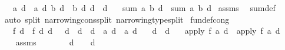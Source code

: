 \begin{isabellebody}
\ \ \ {\isachardoublequoteopen}a\ d\ {\isacharequal}{\kern0pt}\ a{\isacharprime}{\kern0pt}\ d{\isachardoublequoteclose}\ {\isachardoublequoteopen}b\ d\ {\isacharequal}{\kern0pt}\ b{\isacharprime}{\kern0pt}\ d{\isachardoublequoteclose}\ {\isachardoublequoteopen}d\ {\isacharequal}{\kern0pt}\ d{\isacharprime}{\kern0pt}{\isachardoublequoteclose}\isanewline
\ \ \ {\isachardoublequoteopen}sum\ a\ b\ d\ {\isacharequal}{\kern0pt}\ sum\ a{\isacharprime}{\kern0pt}\ b{\isacharprime}{\kern0pt}\ d{\isacharprime}{\kern0pt}{\isachardoublequoteclose}\isanewline
%
\isadelimproof
%
\endisadelimproof
%
\isatagproof
{}\isamarkupfalse%
\ assms\ \isamarkupfalse%
\ sum{\isacharunderscore}{\kern0pt}def\ \isamarkupfalse%
\ {\isacharparenleft}{\kern0pt}auto\ split{\isacharcolon}{\kern0pt}\ narrowing{\isacharunderscore}{\kern0pt}cons{\isachardot}{\kern0pt}split\ narrowing{\isacharunderscore}{\kern0pt}type{\isachardot}{\kern0pt}split{\isacharparenright}{\kern0pt}%
\endisatagproof
{\isafoldproof}%
%
\isadelimproof
\isanewline
%
\endisadelimproof
\isanewline
{}\isamarkupfalse%
\ {\isacharbrackleft}{\kern0pt}fundef{\isacharunderscore}{\kern0pt}cong{\isacharbrackright}{\kern0pt}{\isacharcolon}{\kern0pt}\isanewline
\ \ \ {\isachardoublequoteopen}f\ d\ {\isacharequal}{\kern0pt}\ f{\isacharprime}{\kern0pt}\ d{\isachardoublequoteclose}\ {\isachardoublequoteopen}{\isacharparenleft}{\kern0pt}{\isasymAnd}d{\isacharprime}{\kern0pt}{\isachardot}{\kern0pt}\ {}\ {\isasymle}\ d{\isacharprime}{\kern0pt}\ {\isasymand}\ d{\isacharprime}{\kern0pt}\ {\isacharless}{\kern0pt}\ d\ {\isasymLongrightarrow}\ a\ d{\isacharprime}{\kern0pt}\ {\isacharequal}{\kern0pt}\ a{\isacharprime}{\kern0pt}\ d{\isacharprime}{\kern0pt}{\isacharparenright}{\kern0pt}{\isachardoublequoteclose}\isanewline
\ \ \ {\isachardoublequoteopen}d\ {\isacharequal}{\kern0pt}\ d{\isacharprime}{\kern0pt}{\isachardoublequoteclose}\isanewline
\ \ \ {\isachardoublequoteopen}apply\ f\ a\ d\ {\isacharequal}{\kern0pt}\ apply\ f{\isacharprime}{\kern0pt}\ a{\isacharprime}{\kern0pt}\ d{\isacharprime}{\kern0pt}{\isachardoublequoteclose}\isanewline
%
\isadelimproof
%
\endisadelimproof
%
\isatagproof
{}\isamarkupfalse%
\ {\isacharminus}{\kern0pt}\isanewline
\ \ \isamarkupfalse%
\ assms\isanewline
\ \ \isamarkupfalse%
\ \isamarkupfalse%
\ {\isachardoublequoteopen}{}\ {\isacharless}{\kern0pt}\ d{\isacharprime}{\kern0pt}\ {\isasymLongrightarrow}\ {}\ {\isasymle}\ d{\isacharprime}{\kern0pt}\ {\isacharminus}{\kern0pt}\ {}{\isachardoublequoteclose}\isanewline

\end{isabellebody}

